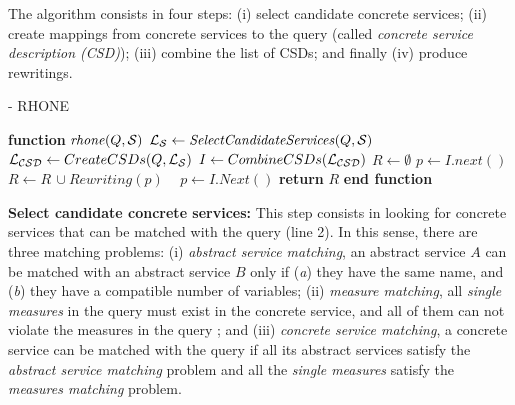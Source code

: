 The algorithm consists in four steps: (i) select candidate concrete services; (ii)
create mappings from concrete services to the query (called \textit{concrete
service description (CSD)}); (iii) combine the list of CSDs; and finally (iv)
produce rewritings.

\begin{algorithm}
\small
\caption{ - RHONE}
\label{algo-rhone}
\begin{algorithmic}[1]
\STATE \textbf{function} $\mathit{rhone} (Q, \bigS)$
 \STATE  $\bigLS \leftarrow \mathit{SelectCandidateServices}(Q, \bigS)$ \label{rhone:buildPCD}
 \STATE  $\bigLCSD \leftarrow CreateCSDs(Q, \bigLS)$
 \STATE  $I \leftarrow CombineCSDs(\bigLCSD)$
 \STATE $R\leftarrow \emptyset$
    \STATE $p \leftarrow I.next()$
  \STATE $R\leftarrow R\,\cup \mathit{Rewriting}(p)$
  \STATE ~\!
   \ENDIF
      \STATE $p \leftarrow I.\mathit{Next}()$
 \ENDWHILE
    \STATE \textbf{return} $R$
\STATE \textbf{end function}
\end{algorithmic}
\end{algorithm}

\noindent \textbf{Select candidate concrete services:} This step consists in
 looking for concrete services that can be matched with the query (line 2). In
 this sense, there are three matching problems: 
 (i) \textit{abstract service matching}, an abstract service $A$ can be
 matched with an abstract service $B$ only if (\textit{a}) they have the same
 name, and (\textit{b}) they have a compatible number of variables;
 (ii) \textit{measure matching}, all \textit{single measures} in the query must
 exist in the concrete service, and all of them can not violate the measures in
 the query ; and 
 (iii) \textit{concrete service matching}, a concrete service can
 be matched with the query if all its abstract services satisfy the \textit{abstract service
 matching} problem and all the \textit{single measures} satisfy the \textit{measures matching} problem.
 

